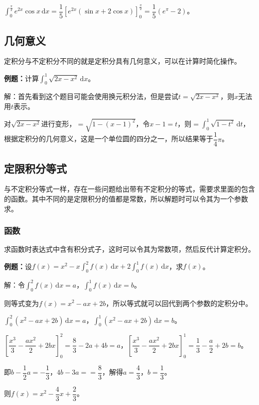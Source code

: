 \documentclass[UTF8, 12pt]{ctexart}
\begin{document}
$\int_0^\frac{\pi}{2}e^{2x}\cos x\,\textrm{d}x=\dfrac{1}{5}[e^{2x}(\sin x+2\cos x)]_0^\frac{\pi}{2}=\dfrac{1}{5}(e^\pi-2)$。

\subsection{几何意义}

定积分与不定积分不同的就是定积分具有几何意义，可以在计算时简化操作。

\textbf{例题：}计算$\int_0^1\sqrt{2x-x^2}\,\textrm{d}x$。

解：首先看到这个题目可能会使用换元积分法，但是尝试$t=\sqrt{2x-x^2}$，则$x$无法用$t$表示。

对$\sqrt{2x-x^2}$进行变形，$=\sqrt{1-(x-1)^2}$，令$x-1=t$，则$=\int_0^1\sqrt{1-t^2}\,\textrm{d}t$，根据定积分的几何意义，这是一个单位圆的四分之一，所以结果等于$\dfrac{1}{4}\pi$。

\subsection{定限积分等式}

与不定积分等式一样，存在一些问题给出带有不定积分的等式，需要求里面的包含的函数。其中不同的是定限积分的值都是常数，所以解题时可以令其为一个参数求。

\subsubsection{函数}

求函数时表达式中含有积分式子，这时可以令其为常数项，然后反代计算定积分。

\textbf{例题：}设$f(x)=x^2-x\int_0^2f(x)\,\textrm{d}x+2\int_0^1f(x)\,\textrm{d}x$，求$f(x)$。

解：令$\int_0^2f(x)\,\textrm{d}x=a$，$\int_0^1f(x)\,\textrm{d}x=b$。

则等式变为$f(x)=x^2-ax+2b$，所以等式就可以回代到两个参数的定积分中。

$\int_0^2(x^2-ax+2b)\,\textrm{d}x=a$，$\int_0^1(x^2-ax+2b)\,\textrm{d}x=b$。

$\left[\dfrac{x^3}{3}-\dfrac{ax^2}{2}+2bx\right]_0^2=\dfrac{8}{3}-2a+4b=a$，$\left[\dfrac{x^3}{3}-\dfrac{ax^2}{2}+2bx\right]_0^1=\dfrac{1}{3}-\dfrac{a}{2}+2b=b$。

即$b-\dfrac{1}{2}a=-\dfrac{1}{3}$，$4b-3a==\dfrac{8}{3}$，解得$a=\dfrac{4}{3}$，$b=\dfrac{1}{3}$。

则$f(x)=x^2-\dfrac{4}{3}x+\dfrac{2}{3}$。
\end{document}
